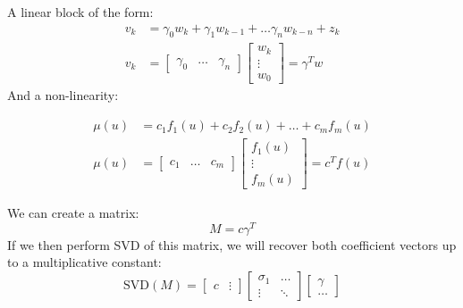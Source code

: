 A linear block of the form:
\begin{equation}
    \begin{aligned}
        v_k &= \gamma_0w_k + \gamma_1w_{k-1} + \dots \gamma_nw_{k-n} + z_k \\
        v_k &= \begin{bmatrix}
            \gamma_0 & \dots  & \gamma_n
        \end{bmatrix} \begin{bmatrix}
            w_k \\  \vdots \\ w_0
        \end{bmatrix} = \gamma^{T} w
        
    \end{aligned}
\end{equation}
And a non-linearity:


\begin{equation}
    \begin{aligned}
        \mu(u) &= c_1f_1(u) + c_2f_2(u) + \dots + c_mf_m(u)\\
        \mu(u) &= \begin{bmatrix}
            c_1 & \dots  & c_m
        \end{bmatrix} \begin{bmatrix}
            f_1(u) \\  \vdots \\ f_m(u)
        \end{bmatrix} = c^{T} f(u)
        
    \end{aligned}
\end{equation}

We can create a matrix:
\begin{equation}
    M = c \gamma^{T}
\end{equation}
If we then perform SVD of this matrix, we will recover both coefficient vectors up to a multiplicative constant:
\begin{equation}
    \text{SVD}(M) = \begin{bmatrix}  c & \vdots  
    \end{bmatrix} \begin{bmatrix}
        \sigma_1 & \dots  \\
        \vdots & \ddots
    \end{bmatrix}
    \begin{bmatrix}
        \gamma   \\
        \dots
    \end{bmatrix}
\end{equation}

